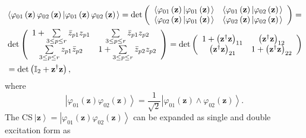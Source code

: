 \documentclass[aps,preprint]{revtex4}%
\begin{document}
\begin{align}
&  \left\langle \varphi_{01}\left(  \mathbf{z}\right)  \varphi_{02}\left(
\mathbf{z}\right)  \left\vert \varphi_{01}\left(  \mathbf{z}\right)
\varphi_{02}\left(  \mathbf{z}\right)  \right.  \right\rangle =\det\left(
\begin{array}
[c]{cc}%
\left\langle \varphi_{01}\left(  \mathbf{z}\right)  \left\vert \varphi
_{01}\left(  \mathbf{z}\right)  \right.  \right\rangle  & \left\langle
\varphi_{01}\left(  \mathbf{z}\right)  \left\vert \varphi_{02}\left(
\mathbf{z}\right)  \right.  \right\rangle \\
\left\langle \varphi_{02}\left(  \mathbf{z}\right)  \left\vert \varphi
_{01}\left(  \mathbf{z}\right)  \right.  \right\rangle  & \left\langle
\varphi_{02}\left(  \mathbf{z}\right)  \left\vert \varphi_{02}\left(
\mathbf{z}\right)  \right.  \right\rangle
\end{array}
\right)  =\nonumber\\
&  \det\left(
\begin{array}
[c]{cc}%
1+\sum\limits_{3\leq p\leq r}\bar{z}_{p1}z_{p1} & \sum\limits_{3\leq p\leq
r}\bar{z}_{p1}z_{p2}\\
\sum\limits_{3\leq p\leq r}z_{p1}\bar{z}_{p2} & 1+\sum\limits_{3\leq p\leq
r}\bar{z}_{p2}z_{p2}%
\end{array}
\right)  =\det\left(
\begin{array}
[c]{cc}%
1+\left(  \mathbf{z}^{\dagger}\mathbf{z}\right)  _{11} & \left(
\mathbf{z}^{\dagger}\mathbf{z}\right)  _{12}\\
\left(  \mathbf{z}^{\dagger}\mathbf{z}\right)  _{21} & 1+\left(
\mathbf{z}^{\dagger}\mathbf{z}\right)  _{22}%
\end{array}
\right)  \nonumber\\
&  =\det\left(  \mathbb{I}_{2}+\mathbf{z}^{\dagger}\mathbf{z}\right)  ,
\end{align}
where
\begin{equation}
\left\vert \varphi_{01}\left(  \mathbf{z}\right)  \varphi_{02}\left(
\mathbf{z}\right)  \right\rangle =\frac{1}{\sqrt{2}}\left\vert \varphi
_{01}\left(  \mathbf{z}\right)  \wedge\varphi_{02}\left(  \mathbf{z}\right)
\right\rangle .
\end{equation}
The CS$\ \left\vert \mathbf{z}\right\rangle =\left\vert \varphi_{01}\left(
\mathbf{z}\right)  \varphi_{02}\left(  \mathbf{z}\right)  \right\rangle $ can
be expanded as single and double excitation form as
\end{document}
